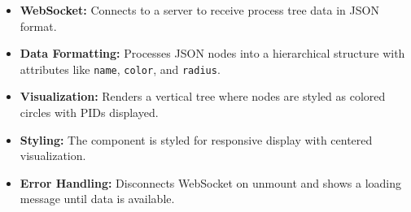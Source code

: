 \documentclass[12pt]{article}
\begin{document}




\begin{itemize}
    \item \textbf{WebSocket:} Connects to a server to receive process tree data in JSON format.
    \item \textbf{Data Formatting:} Processes JSON nodes into a hierarchical structure with attributes like \texttt{name}, \texttt{color}, and \texttt{radius}.
    \item \textbf{Visualization:} Renders a vertical tree where nodes are styled as colored circles with PIDs displayed.
    \item \textbf{Styling:} The component is styled for responsive display with centered visualization.
    \item \textbf{Error Handling:} Disconnects WebSocket on unmount and shows a loading message until data is available.
\end{itemize}
\end{document}
